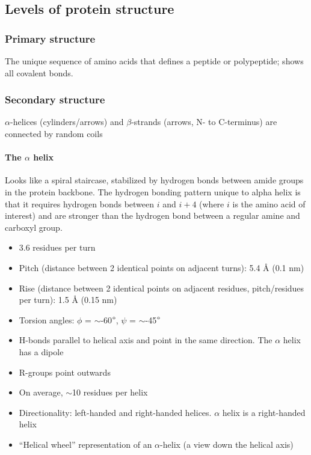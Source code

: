 \documentclass[letterpaper, 12pt]{article}
\begin{document}
\subsection*{Levels of protein structure}

\subsubsection*{Primary structure}
The unique sequence of amino acids that defines a peptide or polypeptide; shows all covalent bonds.

\subsubsection*{Secondary structure}
$\alpha$-helices (cylinders/arrows) and $\beta$-strands (arrows, N- to C-terminus) are connected by random coils

\paragraph{The $\alpha$ helix} Looks like a spiral staircase, stabilized by hydrogen bonds between amide groups in the protein backbone. The hydrogen bonding pattern unique to alpha helix is that it requires hydrogen bonds between $i$ and $i+4$ (where $i$ is the amino acid of interest) and are stronger than the hydrogen bond between a regular amine and carboxyl group.

\begin{itemize}
\item 3.6 residues per turn
\item Pitch (distance between 2 identical points on adjacent turns): 5.4 Å (0.1 nm)
\item Rise (distance between 2 identical points on adjacent residues, pitch/residues per turn): 1.5 Å (0.15 nm)
\item Torsion angles: $\phi$ = $\sim$-60$\degree$, $\psi$ = $\sim$-45$\degree$
\item H-bonds parallel to helical axis and point in the same direction. The $\alpha$ helix has a dipole
\item R-groups point outwards
\item On average, $\sim$10 residues per helix
\item Directionality: left-handed and right-handed helices. $\alpha$ helix is a right-handed helix
\item ``Helical wheel'' representation of an $\alpha$-helix (a view down the helical axis)
\end{itemize}
\end{document}
